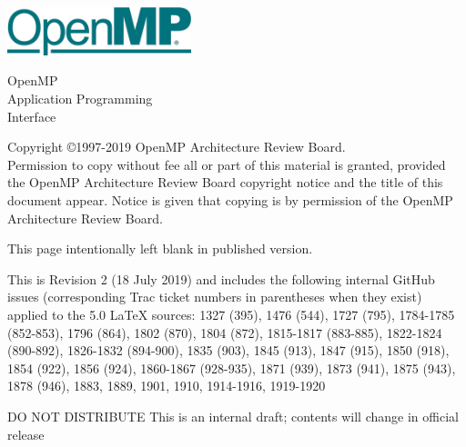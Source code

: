 
  \begin{titlepage}
    \begin{flushleft}
     \hspace{-6em} \includegraphics[width=0.4\textwidth]{openmp-logo.png}
    \end{flushleft}

    \begin{adjustwidth}{-0.75in}{0in}
    \begin{center}
      \Huge
      \textsf{OpenMP\\Application Programming\\Interface}

      \vspace{0.5in}\textsf{    }\vspace{-0.7in}
      \normalsize

      \vspace{1.0in}

      \textbf{\ompversion{}}
    \end{center}
    \end{adjustwidth}

    \vspace{3.0in}

\begin{adjustwidth}{0pt}{1em}\setlength{\parskip}{0.25\baselineskip}%
Copyright \copyright 1997-2019 OpenMP Architecture Review Board.\\
Permission to copy without fee all or part of this material is granted,
provided the OpenMP Architecture Review Board copyright notice and
the title of this document appear. Notice is given that copying is by
permission of the OpenMP Architecture Review Board.\end{adjustwidth}

  \end{titlepage}


\clearpage
\thispagestyle{empty}
\phantom{a}
This page intentionally left blank in published version.

This is Revision 2 (18 July 2019) and includes the following internal 
GitHub issues (corresponding Trac ticket numbers in parentheses when
they exist) applied to the 5.0 LaTeX sources: 1327 (395), 1476 (544), 
1727 (795), 1784-1785 (852-853), 1796 (864), 1802 (870), 1804 (872), 
1815-1817 (883-885), 1822-1824 (890-892), 1826-1832 (894-900), 
1835 (903), 1845 (913), 1847 (915), 1850 (918), 1854 (922), 1856 (924), 
1860-1867 (928-935), 1871 (939), 1873 (941), 1875 (943), 1878 (946), 
1883, 1889, 1901, 1910, 1914-1916, 1919-1920

DO NOT DISTRIBUTE
This is an internal draft; contents will change in official release

\vfill

